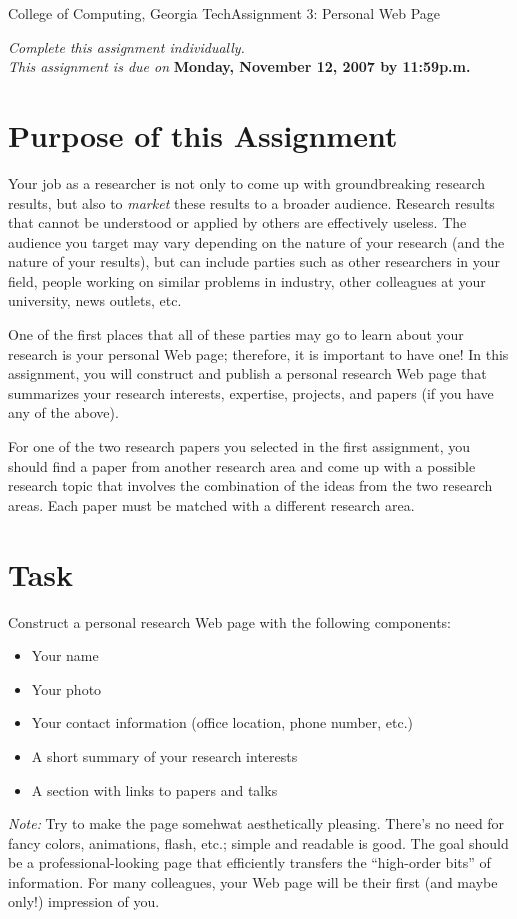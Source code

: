 \documentclass[11pt]{article}
\begin{document}


{College of Computing, Georgia Tech}{Assignment 3: Personal Web Page}

{\em Complete this assignment individually. \\  This
  assignment is due on} {\bf Monday, November 12, 2007 by 11:59p.m.}

\section{Purpose of this Assignment}


Your job as a researcher is not only to come up with groundbreaking
research results, but also to {\em market} these results to a broader
audience.  Research results that cannot be understood or applied by
others are effectively useless.  The audience you target may vary
depending on the nature of your research (and the nature of your
results), but can include parties such as other researchers in your
field, people working on similar problems in industry, other colleagues
at your university, news outlets, etc.

One of the first places that all of these parties may go to learn about
your research is your personal Web page; therefore, it is important to
have one!  In this assignment, you will construct and publish a personal
research Web page that summarizes your research interests, expertise,
projects, and papers (if you have any of the above). 



For one of the two research papers you selected in the first
assignment, you should find a paper from another research area and come
up with a possible research topic that involves the combination of the
ideas from the two research areas.  Each paper must be matched with a
different research area.


\section{Task}


Construct a personal research Web page with the following components:
\begin{itemize}
\item Your name
\item Your photo
\item Your contact information (office location, phone number, etc.)
\item A short summary of your research interests
\item A section with links to papers and talks
\end{itemize}
\noindent
{\em Note:} Try to make the page somehwat aesthetically pleasing.
There's no need for fancy colors, animations, flash, etc.; simple and
readable is good.  The goal should be a professional-looking page that
efficiently transfers the ``high-order bits'' of information.  For many
colleagues, your Web page will be their first (and maybe only!)
impression of you.
\end{document}
